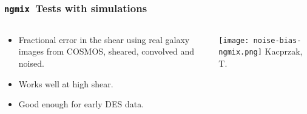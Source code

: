 \documentclass{beamer}
\newcommand{\ngmix}{\texttt{ngmix}}
\begin{document}
\frame
{
    \frametitle{\ngmix\ Tests with simulations}

    \fontsize{9}{0.8\baselineskip}
    \begin{columns}
        \begin{column}{0.3\textwidth}
            \begin{itemize}


                \item Fractional error in the shear using real galaxy
                    images from COSMOS, sheared, convolved and noised.

                \item Works well at high shear.

                \item Good enough for early DES data.

            \end{itemize}
        \end{column}
        \begin{column}{0.7\textwidth}
            \begin{center}
                \texttt{[image: noise-bias-ngmix.png]}
                \newline
                Kacprzak, T.
            \end{center}
        \end{column}
    \end{columns}

}
\end{document}
